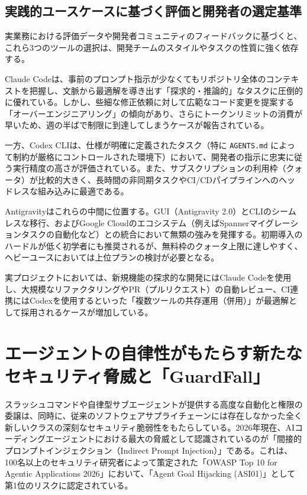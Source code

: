 \documentclass[a4paper,11pt]{ltjsarticle}
\newcommand{\cmd}[1]{\texttt{#1}}
\begin{document}
\subsection{実践的ユースケースに基づく評価と開発者の選定基準}

実業務における評価データや開発者コミュニティのフィードバックに基づくと、これら3つのツールの選択は、開発チームのスタイルやタスクの性質に強く依存する\cite{r19}。

Claude Codeは、事前のプロンプト指示が少なくてもリポジトリ全体のコンテキストを把握し、文脈から最適解を導き出す「探求的・推論的」なタスクに圧倒的に優れている\cite{r19}。しかし、些細な修正依頼に対して広範なコード変更を提案する「オーバーエンジニアリング」の傾向があり、さらにトークンリミットの消費が早いため、週の半ばで制限に到達してしまうケースが報告されている\cite{r19}。

一方、Codex CLIは、仕様が明確に定義されたタスク（特に \cmd{AGENTS.md} によって制約が厳格にコントロールされた環境下）において、開発者の指示に忠実に従う実行精度の高さが評価されている\cite{r19}。また、サブスクリプションの利用枠（クォータ）が比較的大きく、長時間の非同期タスクやCI/CDパイプラインへのヘッドレスな組み込みに最適である\cite{r19}。

Antigravityはこれらの中間に位置する。GUI（Antigravity 2.0）とCLIのシームレスな移行、およびGoogle Cloudのエコシステム（例えばSpannerマイグレーションタスクの自動化など）との統合において無類の強みを発揮する\cite{r23}。初期導入のハードルが低く初学者にも推奨されるが、無料枠のクォータ上限に達しやすく、ヘビーユースにおいては上位プランの検討が必要となる\cite{r18}。

実プロジェクトにおいては、新規機能の探求的な開発にはClaude Codeを使用し、大規模なリファクタリングやPR（プルリクエスト）の自動レビュー、CI連携にはCodexを使用するといった「複数ツールの共存運用（併用）」が最適解として採用されるケースが増加している\cite{r50}。

\section{エージェントの自律性がもたらす新たなセキュリティ脅威と「GuardFall」}

スラッシュコマンドや自律型サブエージェントが提供する高度な自動化と権限の委譲は、同時に、従来のソフトウェアサプライチェーンには存在しなかった全く新しいクラスの深刻なセキュリティ脆弱性をもたらしている。2026年現在、AIコーディングエージェントにおける最大の脅威として認識されているのが「間接的プロンプトインジェクション（Indirect Prompt Injection）」である\cite{r53}。これは、100名以上のセキュリティ研究者によって策定された「OWASP Top 10 for Agentic Applications 2026」において、「Agent Goal Hijacking (ASI01)」として第1位のリスクに認定されている\cite{r53}。
\end{document}
